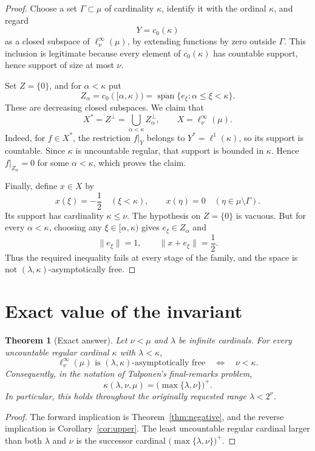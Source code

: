 \documentclass[11pt]{article}
\newtheorem{theorem}{Theorem}
\theoremstyle{remark}
\newcommand{\lin}{\operatorname{span}}
\begin{document}
\begin{proof}
Choose a set \(\Gamma\subset\mu\) of cardinality \(\kappa\), identify it
with the ordinal \(\kappa\), and regard
\[
 Y=c_0(\kappa)
\]
as a closed subspace of \(\ell_\nu^\infty(\mu)\), by extending functions
by zero outside \(\Gamma\).  This inclusion is legitimate because every
element of \(c_0(\kappa)\) has countable support, hence support of size at
most \(\nu\).

Set \(Z=\{0\}\), and for \(\alpha<\kappa\) put
\[
 Z_\alpha=c_0([\alpha,\kappa))
 =\overline{\lin}\{e_\xi:\alpha\leq\xi<\kappa\}.
\]
These are decreasing closed subspaces.  We claim that
\[
 X^*=Z^\perp=\bigcup_{\alpha<\kappa}Z_\alpha^\perp,
 \qquad X=\ell_\nu^\infty(\mu).
\]
Indeed, for \(f\in X^*\), the restriction \(f|_Y\) belongs to
\(Y^*=\ell^1(\kappa)\), so its support is countable.  Since \(\kappa\) is
uncountable regular, that support is bounded in \(\kappa\).  Hence
\(f|_{Z_\alpha}=0\) for some \(\alpha<\kappa\), which proves the claim.

Finally, define \(x\in X\) by
\[
 x(\xi)=-\frac12\quad(\xi<\kappa),
 \qquad x(\eta)=0\quad(\eta\in\mu\setminus\Gamma).
\]
Its support has cardinality \(\kappa\leq\nu\).  The hypothesis on
\(Z=\{0\}\) is vacuous.  But for every \(\alpha<\kappa\), choosing any
\(\xi\in[\alpha,\kappa)\) gives \(e_\xi\in Z_\alpha\) and
\[
 \|e_\xi\|=1,
 \qquad
 \|x+e_\xi\|=\frac12.
\]
Thus the required inequality fails at every stage of the family, and the
space is not \((\lambda,\kappa)\)-asymptotically free.
\end{proof}

\section{Exact value of the invariant}

\begin{theorem}[Exact answer]
\label{thm:exact}
Let \(\nu<\mu\) and \(\lambda\) be infinite cardinals.  For every
uncountable regular cardinal \(\kappa\) with \(\lambda<\kappa\),
\[
 \ell_\nu^\infty(\mu)
 \text{ is }(\lambda,\kappa)\text{-asymptotically free}
 \quad\Longleftrightarrow\quad
 \nu<\kappa.
\]
Consequently, in the notation of Talponen's final-remarks problem,
\[
 \boxed{\displaystyle
 \kappa(\lambda,\nu,\mu)
 =\bigl(\max\{\lambda,\nu\}\bigr)^+.}
\]
In particular, this holds throughout the originally requested range
\(\lambda<2^\nu\).
\end{theorem}

\begin{proof}
The forward implication is Theorem~\ref{thm:negative}, and the reverse
implication is Corollary~\ref{cor:upper}.  The least uncountable regular
cardinal larger than both \(\lambda\) and \(\nu\) is the successor
cardinal \(\bigl(\max\{\lambda,\nu\}\bigr)^+\).
\end{proof}
\end{document}
